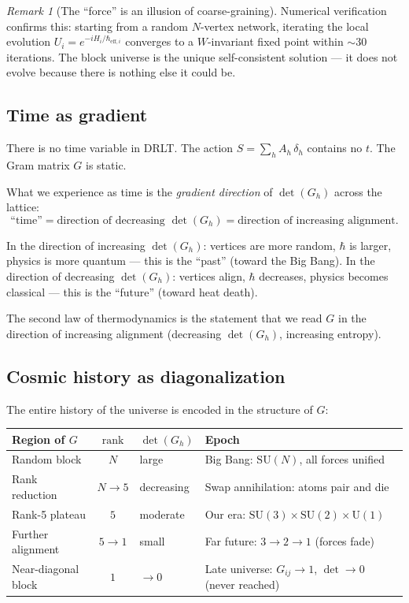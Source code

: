 \documentclass[12pt]{article}
\theoremstyle{remark}
\newtheorem{remark}[theorem]{Remark}
\theoremstyle{definition}
\begin{document}
\begin{remark}[The ``force'' is an illusion of coarse-graining]
Numerical verification confirms this: starting from a random $N$-vertex network, iterating the local evolution $U_i = e^{-iH_i/\hbar_{\text{eff},i}}$ converges to a $W$-invariant fixed point within $\sim 30$ iterations. The block universe is the unique self-consistent solution --- it does not evolve because there is nothing else it could be.

\subsection{Time as gradient}

There is no time variable in DRLT. The action $S = \sum_h A_h\,\delta_h$ contains no $t$. The Gram matrix $G$ is static.

What we experience as time is the \emph{gradient direction} of $\det(G_h)$ across the lattice:
\begin{equation}
\text{``time''} = \text{direction of decreasing } \det(G_h) = \text{direction of increasing alignment}.
\end{equation}

In the direction of increasing $\det(G_h)$: vertices are more random, $\hbar$ is larger, physics is more quantum --- this is the ``past'' (toward the Big Bang). In the direction of decreasing $\det(G_h)$: vertices align, $\hbar$ decreases, physics becomes classical --- this is the ``future'' (toward heat death).

The second law of thermodynamics is the statement that we read $G$ in the direction of increasing alignment (decreasing $\det(G_h)$, increasing entropy).

\subsection{Cosmic history as diagonalization}

The entire history of the universe is encoded in the structure of $G$:

\begin{center}
\begin{tabular}{lcll}
\hline
Region of $G$ & $\text{rank}$ & $\det(G_h)$ & Epoch \\
\hline
Random block & $N$ & large & Big Bang: $\text{SU}(N)$, all forces unified \\
Rank reduction & $N \to 5$ & decreasing & Swap annihilation: atoms pair and die \\
Rank-5 plateau & $5$ & moderate & Our era: $\text{SU}(3)\!\times\!\text{SU}(2)\!\times\!\text{U}(1)$ \\
Further alignment & $5 \to 1$ & small & Far future: $3 \to 2 \to 1$ (forces fade) \\
Near-diagonal block & $1$ & $\to 0$ & Late universe: $G_{ij} \to 1$, $\det \to 0$ (never reached) \\
\hline
\end{tabular}
\end{center}


\end{remark}
\end{document}
